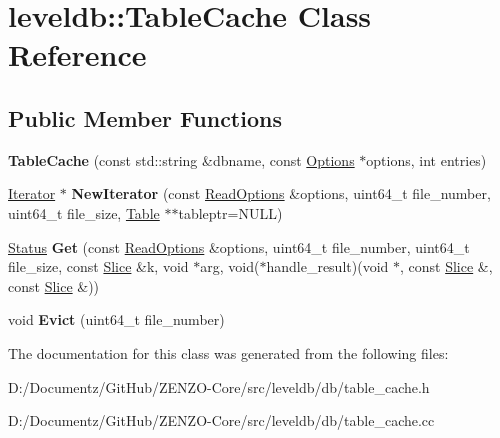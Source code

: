 \hypertarget{classleveldb_1_1_table_cache}{}\section{leveldb\+::Table\+Cache Class Reference}
\label{classleveldb_1_1_table_cache}
\subsection*{Public Member Functions}
\begin{DoxyCompactItemize}
\item 
\mbox{\label{classleveldb_1_1_table_cache_acca8df0a6305b166a7c88f27d1b3e377}} 
{\bfseries Table\+Cache} (const std\+::string \&dbname, const \mbox{\hyperlink{structleveldb_1_1_options}{Options}} $\ast$options, int entries)
\item 
\mbox{\label{classleveldb_1_1_table_cache_afe8c83b1cbbf3bfc06c66a69611aa250}} 
\mbox{\hyperlink{classleveldb_1_1_iterator}{Iterator}} $\ast$ {\bfseries New\+Iterator} (const \mbox{\hyperlink{structleveldb_1_1_read_options}{Read\+Options}} \&options, uint64\+\_\+t file\+\_\+number, uint64\+\_\+t file\+\_\+size, \mbox{\hyperlink{classleveldb_1_1_table}{Table}} $\ast$$\ast$tableptr=N\+U\+LL)
\item 
\mbox{\label{classleveldb_1_1_table_cache_af43ba38b52742e9f5589321747535444}} 
\mbox{\hyperlink{classleveldb_1_1_status}{Status}} {\bfseries Get} (const \mbox{\hyperlink{structleveldb_1_1_read_options}{Read\+Options}} \&options, uint64\+\_\+t file\+\_\+number, uint64\+\_\+t file\+\_\+size, const \mbox{\hyperlink{classleveldb_1_1_slice}{Slice}} \&k, void $\ast$arg, void($\ast$handle\+\_\+result)(void $\ast$, const \mbox{\hyperlink{classleveldb_1_1_slice}{Slice}} \&, const \mbox{\hyperlink{classleveldb_1_1_slice}{Slice}} \&))
\item 
\mbox{\label{classleveldb_1_1_table_cache_a57b81c58ff0533514b3a5d1652f044bc}} 
void {\bfseries Evict} (uint64\+\_\+t file\+\_\+number)
\end{DoxyCompactItemize}


The documentation for this class was generated from the following files\+:\begin{DoxyCompactItemize}
\item 
D\+:/\+Documentz/\+Git\+Hub/\+Z\+E\+N\+Z\+O-\/\+Core/src/leveldb/db/table\+\_\+cache.\+h\item 
D\+:/\+Documentz/\+Git\+Hub/\+Z\+E\+N\+Z\+O-\/\+Core/src/leveldb/db/table\+\_\+cache.\+cc\end{DoxyCompactItemize}
